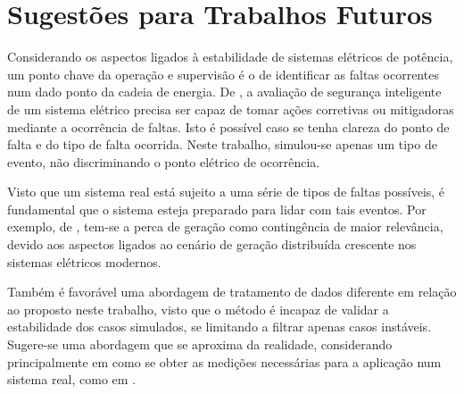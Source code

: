 \documentclass[12pt,oneside,a4paper,chapter=TITLE,section=TITLE,sumario=tradicional,english,brazil]{abntex2}
\begin{document}
\section{Sugestões para Trabalhos Futuros}
Considerando os aspectos ligados à estabilidade de sistemas elétricos de potência, um ponto chave da operação e supervisão é o de identificar as faltas ocorrentes num dado ponto da cadeia de energia. De \textcite{kundur2004}, a avaliação de segurança inteligente de um sistema elétrico precisa ser capaz de tomar ações corretivas ou mitigadoras mediante a ocorrência de faltas. Isto é possível caso se tenha clareza do ponto de falta e do tipo de falta ocorrida. Neste trabalho, simulou-se apenas um tipo de evento, não discriminando o ponto elétrico de ocorrência.\par 
Visto que um sistema real está sujeito a uma série de tipos de faltas possíveis, é fundamental que o sistema esteja preparado para lidar com tais eventos. Por exemplo, de \textcite{zhang2021}, tem-se a perca de geração como contingência de maior relevância, devido aos aspectos ligados ao cenário de geração distribuída crescente nos sistemas elétricos modernos.\par 
Também é favorável uma abordagem de tratamento de dados diferente em relação ao proposto neste trabalho, visto que o método é incapaz de validar a estabilidade dos casos simulados, se limitando a filtrar apenas casos instáveis. Sugere-se uma abordagem que se aproxima da realidade, considerando principalmente em como se obter as medições necessárias para a aplicação num sistema real, como em  \textcite{amjady2004}.
\postextual

\printbibliography
	
\end{document}
